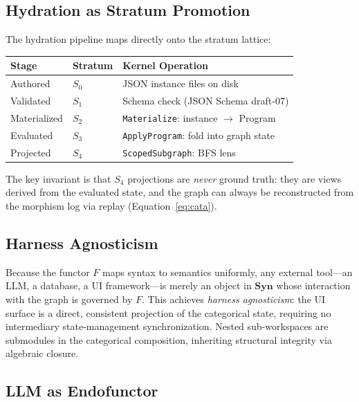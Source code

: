 \documentclass[submission,copyright,creativecommons]{eptcs}
\begin{document}


\subsection{Hydration as Stratum Promotion}

The hydration pipeline maps directly onto the stratum lattice:

\begin{center}
\begin{tabular}{@{}lll@{}}
\toprule
Stage & Stratum & Kernel Operation \\
\midrule
Authored   & $S_0$ & JSON instance files on disk \\
Validated  & $S_1$ & Schema check (JSON Schema draft-07) \\
Materialized & $S_2$ & \texttt{Materialize}: instance $\to$ Program \\
Evaluated  & $S_3$ & \texttt{ApplyProgram}: fold into graph state \\
Projected  & $S_4$ & \texttt{ScopedSubgraph}: BFS lens \\
\bottomrule
\end{tabular}
\end{center}

The key invariant is that $S_4$ projections are \emph{never} ground truth:
they are views derived from the evaluated state, and the graph can always be
reconstructed from the morphism log via replay (Equation~\ref{eq:cata}).

\subsection{Harness Agnosticism}

Because the functor $F$ maps syntax to semantics uniformly, any external
tool---an LLM, a database, a UI framework---is merely an object in
$\mathbf{Syn}$ whose interaction with the graph is governed by $F$. This
achieves \emph{harness agnosticism}: the UI surface is a direct, consistent
projection of the categorical state, requiring no intermediary state-management
synchronization. Nested sub-workspaces are submodules in the categorical
composition, inheriting structural integrity via algebraic closure.

\subsection{LLM as Endofunctor}
\label{subsec:llm-endofunctor}
\end{document}
